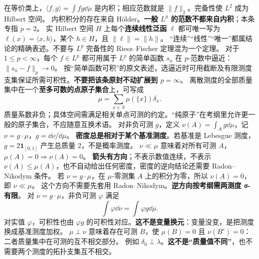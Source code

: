 在等价类上，$\langle f,g\rangle=\int fg\dd\mu$ 是内积；相应范数就是 $\|f\|_2$。完备性使 $L^2$ 成为 Hilbert 空间。
内积积分的存在来自 Hölder。\textbf{一般 $L^p$ 的范数不都来自内积}；本条专指 $p=2$。
实 Hilbert 空间 $H$ 上每个\textbf{连续线性泛函} $\ell$ 都可唯一写为 $\ell(x)=\langle x,h\rangle$，某个 $h\in H$，且 $\|\ell\|=\|h\|$。
“连续”“线性”“唯一”都属结论的精确表述。不要与 $L^p$ 完备性的 Riesz–Fischer 定理混为一个定理。
对于\textbf{$1\le p<\infty$}，每个 $f\in L^p$ 都可用属于 $L^p$ 的简单函数 $s_n$ 在 $p$-范数中逼近：$\|s_n-f\|_p\to0$。
按“简单函数可积”的原文表述，选逼近时可用截断及有限测度支集保证所需可积性。\textbf{不要把该条原封不动扩展到 $p=\infty$}。
离散测度的全部质量集中在一个\textbf{至多可数的点原子集合}上，可写成
\[
\mu=\sum_{x\in S}\mu(\{x\})\delta_x.
\]
质量系数非负；具体空间需满足相关单点可测的约定。“纯原子”在考纲里允许更一般的原子集合，不应随意互换术语。
对非负可测 $g$，定义 $\nu(A)=\int_A g\dd\mu$，记 $\nu=g\cdot\mu$，$g=\dd\nu/\dd\mu$。
\textbf{密度总是相对于某个基准测度}。若基准是 Lebesgue 测度，$g=2\mathbf1_{[0,1]}$ 产生总质量 $2$，不是概率测度。
$\nu\ll\mu$ 意味着对所有可测 $A$，$\mu(A)=0\Rightarrow\nu(A)=0$。
\textbf{箭头有方向}；不表示数值连续，不表示 $\nu(A)\le\mu(A)$，也不自动给出任何密度，密度的逆向结论还需要 Radon–Nikodym 条件。
若 $\nu=g\cdot\mu$，在 $\mu$-零测集 $A$ 上的积分为零，所以 $\nu(A)=0$，即 $\nu\ll\mu$。
这个方向不需要先套用 Radon–Nikodym。\textbf{逆方向按考纲需两测度 σ-有限}。
对 $\nu=g\cdot\mu$，非负可测 $\varphi$ 满足
\[
\int\varphi\dd\nu=\int\varphi g\dd\mu.
\]
对实值 $\varphi$，可积性也由 $\varphi g$ 的可积性对应。\textbf{这不是变量换元}：变量没变，是把测度换成基准测度加权。
$\mu\perp\nu$ 意味着存在可测 $B$，使 $\mu(B)=0$ 且 $\nu(B^c)=0$：二者质量集中在可测的互不相交部分。
例如 $\delta_0\perp\lambda$。\textbf{这不是“质量值不同”}，也不需要两个测度的拓扑支集互不相交。

